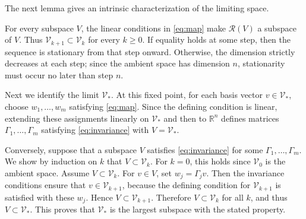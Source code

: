 \documentclass[twocolumn]{autart}
\begin{document}
The next lemma gives an intrinsic characterization of the limiting space.
%
%
\vspace{-2mm}
%
\begin{pf}
For every subspace $V$, the linear conditions in \cref{eq:map} make
$\mathcal R(V)$ a subspace of $V$. Thus
$\mathcal V_{k+1}\subset\mathcal V_k$ for every $k\geq0$.
If equality holds at some step, then
the sequence is stationary from that step onward. Otherwise, the dimension
strictly decreases at each step; since the ambient space has dimension $n$,
stationarity must occur no later than step $n$.

Next we identify the limit $\mathcal V_*$. At this fixed point, for each
basis vector $v\in\mathcal V_*$, choose $w_1,\dots,w_m$ satisfying
\cref{eq:map}. Since the defining condition is linear, extending these
assignments linearly on $\mathcal V_*$ and then to $\mathbb R^n$ defines
matrices $\Gamma_1,\dots,\Gamma_m$ satisfying \cref{eq:invariance}
with $V=\mathcal V_*$.

Conversely, suppose that a subspace $V$ satisfies \cref{eq:invariance}
for some $\Gamma_1,\dots,\Gamma_m$. We show by induction on $k$ that
$V\subset\mathcal V_k$. For $k=0$, this holds since $\mathcal V_0$ is
the ambient space. Assume $V\subset\mathcal V_k$. For $v\in V$, set
$w_j=\Gamma_jv$. Then the invariance conditions ensure that
$v\in\mathcal V_{k+1}$, because the defining condition for
$\mathcal V_{k+1}$ is satisfied with these $w_j$. Hence
$V\subset\mathcal V_{k+1}$. Therefore $V\subset\mathcal V_k$ for all
$k$, and thus $V\subset\mathcal V_*$. This proves that $\mathcal V_*$
is the largest subspace with the stated property.
\end{pf}
%
\end{document}
